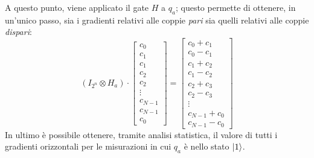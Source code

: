 A questo punto, viene applicato il gate $H$ a $q_a$; questo permette
di ottenere, in un'unico passo, sia i gradienti relativi alle coppie \emph{pari} sia quelli relativi alle coppie \emph{dispari}:
\begin{equation*}
	(I_{2^n} \otimes H_a) \cdot \begin{bmatrix}
		c_0\\c_1\\c_1\\c_2\\c_2\\\vdots\\c_{N-1}\\c_{N-1}\\c_0
	\end{bmatrix} = \begin{bmatrix}
		c_0+c_1\\c_0-c_1\\c_1+c_2\\c_1-c_2\\c_2+c_3\\c_2-c_3\\\vdots\\c_{N-1}+c_0\\c_{N-1}-c_0
	\end{bmatrix}
	\label{eq:h-to-adj-qubit}
\end{equation*}
In ultimo è possibile ottenere, tramite analisi statistica, il valore di tutti i
gradienti orizzontali per le misurazioni in cui $q_a$ è nello stato $\lvert1\rangle$.

